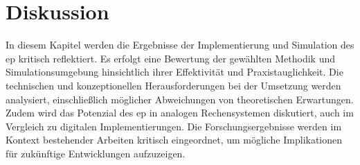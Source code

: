 \newpage

\section{Diskussion}

In diesem Kapitel werden die Ergebnisse der Implementierung und Simulation des \ac{ep} kritisch reflektiert. Es erfolgt eine Bewertung der gewählten Methodik und Simulationsumgebung hinsichtlich ihrer Effektivität und Praxistauglichkeit. Die technischen und konzeptionellen Herausforderungen bei der Umsetzung werden analysiert, einschließlich möglicher Abweichungen von theoretischen Erwartungen. Zudem wird das Potenzial des \ac{ep} in analogen Rechensystemen diskutiert, auch im Vergleich zu digitalen Implementierungen. Die Forschungsergebnisse werden im Kontext bestehender Arbeiten kritisch eingeordnet, um mögliche Implikationen für zukünftige Entwicklungen aufzuzeigen.





